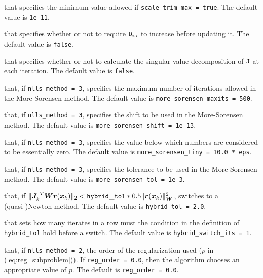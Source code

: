 \begin{description}
that specifies the minimum value allowed if {\tt scale\_trim\_max = true}.
The default value is {\tt 1e-11}.

that specifies whether or not to require ${\tt D}_{i,i}$ to increase before updating it.
The default value is {\tt false}.

that specifies whether or not to calculate the singular value decomposition of ${\tt J}$
at each iteration.  
The default value is {\tt false}.



that, if {\tt nlls\_method = 3}, specifies the maximum number of iterations allowed in the More-Sorensen method.
The default value is {\tt more\_sorensen\_maxits = 500}.

that, if {\tt nlls\_method = 3}, specifies the shift to be used in the More-Sorensen method.
The default value is {\tt more\_sorensen\_shift = 1e-13}.

that, if {\tt nlls\_method = 3}, specifies the value below which numbers are considered to be essentially zero.
The default value is {\tt more\_sorensen\_tiny = 10.0 * eps}.

that, if {\tt nlls\_method = 3}, specifies the tolerance to be used in the More-Sorensen method.
The default value is {\tt more\_sorensen\_tol = 1e-3}.

that, if \(\|{{\bm J}_{k}^{}}^T {\bm W} {\bm r}({\bm x}_k) \|_2 < \mathtt{hybrid\_tol} * 0.5 \|{\bm r}({\bm x}_k)\|_{\bm W}^2\), switches to a \newline(quasi-)Newton method.
The default value is {\tt hybrid\_tol = 2.0}.

that sets how many iterates in a row must the condition in the definition of {\tt hybrid\_tol} hold before a switch.
The default value is {\tt hybrid\_switch\_its = 1}.

that, if {\tt nlls\_method = 2}, the order of the regularization used ($p$ in (\ref{eq:reg_subproblem})).  If {\tt reg\_order = 0.0}, then the algorithm
chooses an appropriate value of $p$. The default is {\tt reg\_order = 0.0}.


\end{description}
